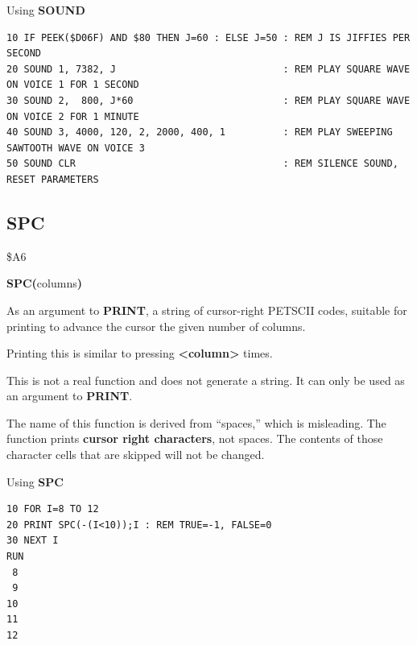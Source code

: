 \begin{description}[leftmargin=2cm,style=nextline]
\item [Example:]  Using {\bf SOUND}

\begin{tcolorbox}[colback=black,coltext=white]
\verbatimfont{\codefont}
\begin{verbatim}
10 IF PEEK($D06F) AND $80 THEN J=60 : ELSE J=50 : REM J IS JIFFIES PER SECOND
20 SOUND 1, 7382, J                             : REM PLAY SQUARE WAVE ON VOICE 1 FOR 1 SECOND
30 SOUND 2,  800, J*60                          : REM PLAY SQUARE WAVE ON VOICE 2 FOR 1 MINUTE
40 SOUND 3, 4000, 120, 2, 2000, 400, 1          : REM PLAY SWEEPING SAWTOOTH WAVE ON VOICE 3
50 SOUND CLR                                    : REM SILENCE SOUND, RESET PARAMETERS
\end{verbatim}
\end{tcolorbox}
\end{description}


\newpage
\subsection{SPC}
\begin{description}[leftmargin=2cm,style=nextline]
\item [Token:]    \$A6

\item [Format:]   {\bf SPC(}columns{\bf)}

\item [Returns:]  As an argument to {\bf PRINT}, a string of cursor-right PETSCII codes, suitable for printing to advance the cursor the given number of columns.

                  Printing this is similar to pressing \megakey{$\rightarrow$} {\bf <column>} times.

                  This is not a real function and does not generate a string. It can only be used as an argument to {\bf PRINT}.

\item [Remarks:]  The name of this function is derived from ``spaces,'' which is misleading. The function prints {\bf cursor right characters}, not spaces. The contents of those character cells that are skipped will not be changed.

\item [Example:]  Using {\bf SPC}

\begin{tcolorbox}[colback=black,coltext=white]
\verbatimfont{\codefont}
\begin{verbatim}
10 FOR I=8 TO 12
20 PRINT SPC(-(I<10));I : REM TRUE=-1, FALSE=0
30 NEXT I
RUN
 8
 9
10
11
12
\end{verbatim}
\end{tcolorbox}
\end{description}

